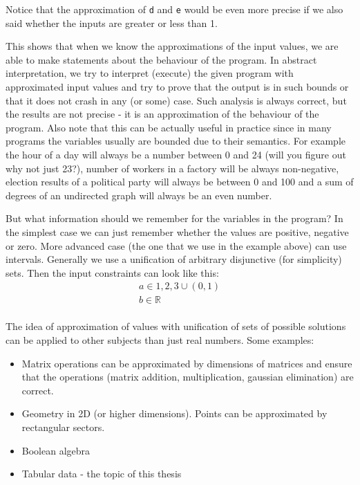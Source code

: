 Notice that the approximation of \verb|d| and \verb|e| would be even more precise if we also said whether the inputs
are greater or less than 1.

This shows that when we know the approximations of the input values, we are able to make statements about the behaviour
of the program.
In abstract interpretation, we try to interpret (execute) the given program with approximated input values and try to
prove that the output is in such bounds or that it does not crash in any (or some) case.
Such analysis is always correct, but the results are not precise - it is an approximation of the behaviour of the program.
Also note that this can be actually useful in practice since in many programs the variables usually are bounded due to
their semantics.
For example the hour of a day will always be a number between 0 and 24 (will you figure out why not just 23?),
number of workers in a factory will be always non-negative, election results of a political party will always be
between 0 and 100 and a sum of degrees of an undirected graph will always be an even number.

But what information should we remember for the variables in the program?
In the simplest case we can just remember whether the values are positive, negative or zero.
More advanced case (the one that we use in the example above) can use intervals.
Generally we use a unification of arbitrary disjunctive (for simplicity) sets.
Then the input constraints can look like this:
\begin{gather*}
    a \in {1, 2, 3} \cup (0, 1)\\
    b \in \mathbb{R}\\
\end{gather*}

The idea of approximation of values with unification of sets of possible solutions can be applied to other subjects than
just real numbers.
Some examples:
\begin{itemize}
    \item Matrix operations can be approximated by dimensions of matrices and ensure that the operations
    (matrix addition, multiplication, gaussian elimination) are correct.

    \item Geometry in 2D (or higher dimensions).
    Points can be approximated by rectangular sectors.

    \item Boolean algebra

    \item Tabular data - the topic of this thesis
\end{itemize}


